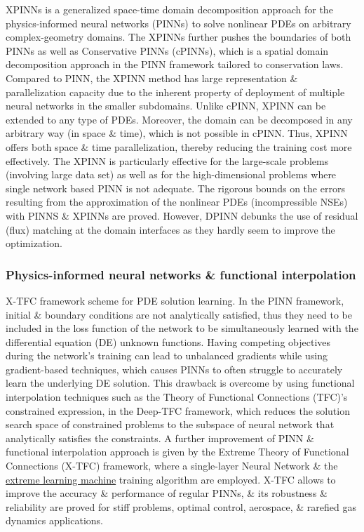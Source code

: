 \documentclass{article}
\begin{document}
XPINNs is a generalized space-time domain decomposition approach for the physics-informed neural networks (PINNs) to solve nonlinear PDEs on arbitrary complex-geometry domains. The XPINNs further pushes the boundaries of both PINNs as well as Conservative PINNs (cPINNs), which is a spatial domain decomposition approach in the PINN framework tailored to conservation laws. Compared to PINN, the XPINN method has large representation \& parallelization capacity due to the inherent property of deployment of multiple neural networks in the smaller subdomains. Unlike cPINN, XPINN can be extended to any type of PDEs. Moreover, the domain can be decomposed in any arbitrary way (in space \& time), which is not possible in cPINN. Thus, XPINN offers both space \& time parallelization, thereby reducing the training cost more effectively. The XPINN is particularly effective for the large-scale problems (involving large data set) as well as for the high-dimensional problems where single network based PINN is not adequate. The rigorous bounds on the errors resulting from the approximation of the nonlinear PDEs (incompressible NSEs) with PINNS \& XPINNs are proved. However, DPINN debunks the use of residual (flux) matching at the domain interfaces as they hardly seem to improve the optimization.

\subsubsection{Physics-informed neural networks \& functional interpolation}
{\sf X-TFC framework scheme for PDE solution learning.} In the PINN framework, initial \& boundary conditions are not analytically satisfied, thus they need to be included in the loss function of the network to be simultaneously learned with the differential equation (DE) unknown functions. Having competing objectives during the network's training can lead to unbalanced gradients while using gradient-based techniques, which causes PINNs to often struggle to accurately learn the underlying DE solution. This drawback is overcome by using functional interpolation techniques such as the Theory of Functional Connections (TFC)'s constrained expression, in the Deep-TFC framework, which reduces the solution search space of constrained problems to the subspace of neural network that analytically satisfies the constraints. A further improvement of PINN \& functional interpolation approach is given by the Extreme Theory of Functional Connections (X-TFC) framework, where a single-layer Neural Network \& the \href{https://en.wikipedia.org/wiki/Extreme_learning_machine}{extreme learning machine} training algorithm are employed. X-TFC allows to improve the accuracy \& performance of regular PINNs, \& its robustness \& reliability are proved for stiff problems, optimal control, aerospace, \& rarefied gas dynamics applications.
\end{document}
